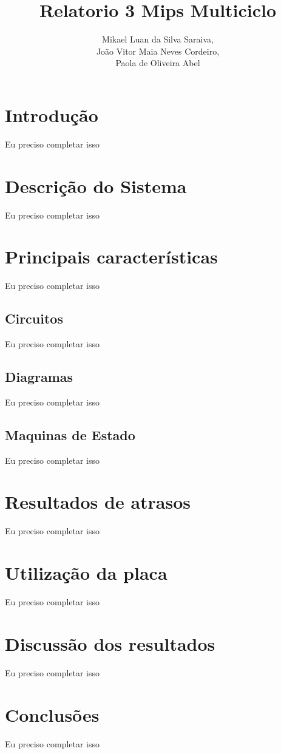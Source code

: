\documentclass{article}
\title{Relatorio 3 \- Mips Multiciclo}
\author{%
    Mikael Luan da Silva Saraiva, \\
    João Vitor Maia Neves Cordeiro, \\
    Paola de Oliveira Abel
    }
\begin{document}
    \maketitle

    \section{Introdução}

    Eu preciso completar isso

    \section{Descrição do Sistema}

    Eu preciso completar isso

    \section{Principais características}

    Eu preciso completar isso

    \subsection{Circuitos}

    Eu preciso completar isso

    \subsection{Diagramas}

    Eu preciso completar isso

    \subsection{Maquinas de Estado}

    Eu preciso completar isso

    \section{Resultados de atrasos}

    Eu preciso completar isso

    \section{Utilização da placa}

    Eu preciso completar isso

    \section{Discussão dos resultados}

    Eu preciso completar isso

    \section{Conclusões}

    Eu preciso completar isso
\end{document}
